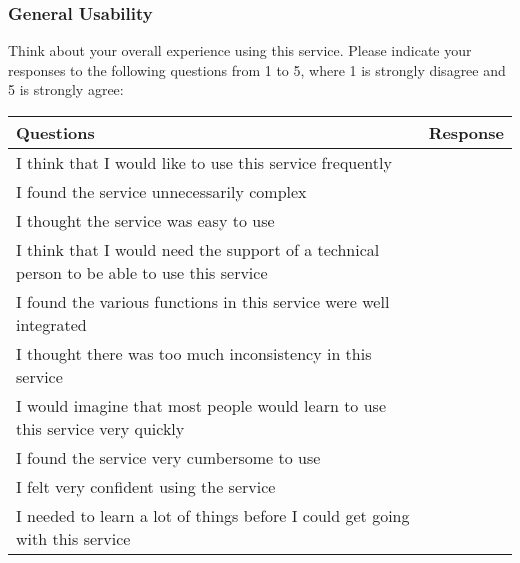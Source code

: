 \subsubsection{General Usability}
Think about your overall experience using this service. Please indicate your responses to the following questions from 1 to 5, where 1 is strongly disagree and 5 is strongly agree:

\begin{table}[h]
\centering
\renewcommand{\arraystretch}{1.5} %
\begin{tabularx}{\textwidth}{|X|X|} %
\hline
\textbf{Questions} & \textbf{Response} \\ \hline
I think that I would like to use this service frequently &  \\ \hline
I found the service unnecessarily complex &  \\ \hline
I thought the service was easy to use &  \\ \hline
I think that I would need the support of a technical person to be able to use this service &  \\ \hline
I found the various functions in this service were well integrated &  \\ \hline
I thought there was too much inconsistency in this service &  \\ \hline
I would imagine that most people would learn to use this service very quickly &  \\ \hline
I found the service very cumbersome to use &  \\ \hline
I felt very confident using the service &  \\ \hline
I needed to learn a lot of things before I could get going with this service &  \\ \hline
\end{tabularx}
\end{table}